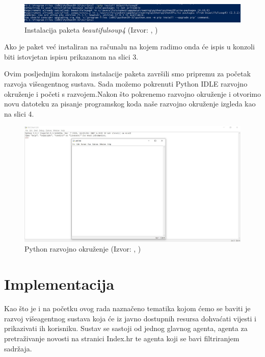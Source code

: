 \documentclass[]{foi} %
\begin{document}
\begin{figure}[h!]
    \centering
    \includegraphics[width=1.0\textwidth]{slike/beautifulsoup4-install.jpg}
    \caption{Instalacija paketa \textit{beautifulsoup4} (Izvor: \citeauthor{ispisInstalacijeBeautifulsoup4}, \citeyear{ispisInstalacijeBeautifulsoup4})}
    \label{fig:instalacijaBeautifulSoup4}
\end{figure}

Ako je paket već instaliran na računalu na kojem radimo onda će ispis u konzoli biti istovjetan ispisu prikazanom na slici 3.

Ovim posljednjim korakom instalacije paketa završili smo pripremu za početak razvoja višeagentnog sustava. Sada možemo pokrenuti Python IDLE razvojno okruženje i početi s razvojem.Nakon što pokrenemo razvojno okruženje i otvorimo novu datoteku za pisanje programskog koda naše razvojno okruženje izgleda kao na slici 4.

\begin{figure}[h!]
    \centering
    \includegraphics[width=1.0\textwidth]{slike/pythonIDLE.jpg}
    \caption{Python razvojno okruženje (Izvor: \citeauthor{idle}, \citeyear{idle})}
    \label{fig:PythonIDLE}
\end{figure}

\newpage

\chapter{Implementacija}

Kao što je i na početku ovog rada naznačeno tematika kojom ćemo se baviti je razvoj višeagentnog sustava koja će iz javno dostupnih resursa dohvaćati vijesti i prikazivati ih korisniku. Sustav se sastoji od jednog glavnog agenta, agenta za pretraživanje novosti na stranici Index.hr te agenta koji se bavi filtriranjem sadržaja.
\end{document}
